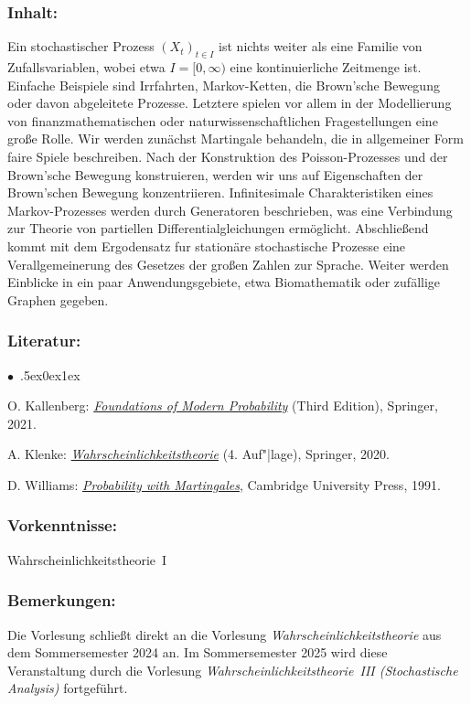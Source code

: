 \documentclass[a4paper,10pt]{article}
\renewenvironment{itemize}{\begin{list}{$\bullet$\ }{\itemsep.5ex\setlength{\topsep}{0.5\itemsep}\parsep0ex\labelsep1ex\settowidth{\labelwidth}{$\bullet$\ }\setlength{\leftmargin}{\labelwidth}\addtolength{\leftmargin}{3ex}\addtolength{\leftmargin}{\labelsep}}}{\end{list}}
\begin{document}
\subsubsection*{\large
    Inhalt:
}
Ein stochastischer Prozess $(X_t)_{t\in I}$ ist nichts weiter als eine Familie von Zufallsvariablen, wobei etwa $I = [0,\infty)$ eine kontinuierliche Zeitmenge ist. Einfache Beispiele sind Irrfahrten, Markov-Ketten, die Brown’sche Bewegung oder davon abgeleitete Prozesse. Letztere spielen vor allem in der Modellierung von finanzmathematischen oder naturwissenschaftlichen Fragestellungen eine große Rolle. Wir werden zunächst Martingale behandeln, die in allgemeiner Form faire Spiele beschreiben. Nach der Konstruktion des Poisson-Prozesses und der Brown’sche Bewegung konstruieren, werden wir uns auf Eigenschaften der Brown'schen Bewegung konzentriieren. Infinitesimale Charakteristiken eines Markov-Prozesses werden durch Generatoren beschrieben, was eine Verbindung zur Theorie von partiellen Differentialgleichungen ermöglicht. Abschließend kommt mit dem Ergodensatz fur stationäre stochastische Prozesse eine Verallgemeinerung des Gesetzes der großen Zahlen zur Sprache. Weiter werden Einblicke in ein paar Anwendungsgebiete, etwa Biomathematik oder zufällige Graphen gegeben. 
\subsubsection*{\large
    Literatur:
}
\begin{itemize}
\item
 O. Kallenberg: \href{https://link.springer.com/book/10.1007/978-3-030-61871-1}{\emph{Foundations of Modern Probability}} (Third Edition), Springer, 2021.
\item
 A. Klenke: \href{https://link.springer.com/book/10.1007/978-3-662-62089-2}{\emph{Wahrscheinlichkeitstheorie}} (4. Auf"|lage), Springer, 2020. 
\item 
D. Williams: \href{https://edisciplinas.usp.br/pluginfile.php/343758/mod_folder/content/0/Probability With Martingales(Williams).pdf}{\emph{Probability with Martingales}}, Cambridge University Press, 1991. 
\end{itemize}
\subsubsection*{\large
    Vorkenntnisse:
}
Wahrscheinlichkeitstheorie~I
\subsubsection*{\large
    Bemerkungen:
}
Die Vorlesung schließt direkt an die Vorlesung {\em Wahrscheinlichkeitstheorie} aus dem Sommersemester 2024 an. Im Sommersemester 2025 wird diese Veranstaltung durch die Vorlesung {\em Wahrscheinlichkeitstheorie~III (Stochastische Analysis)} fortgeführt.
\end{document}
